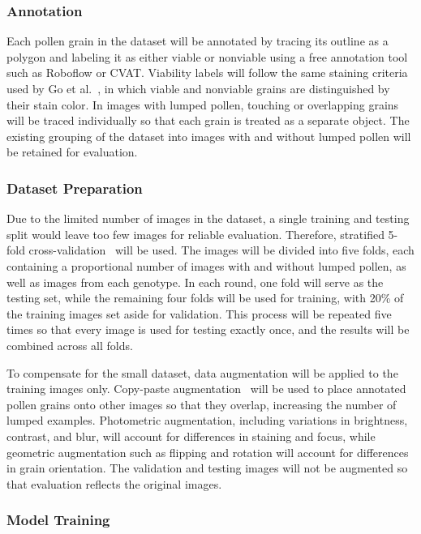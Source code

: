 \subsubsection{Annotation}
\label{sec:m-annotation}

Each pollen grain in the dataset will be annotated by tracing its outline as a polygon and labeling it as either viable or nonviable using a free annotation tool such as Roboflow or CVAT. Viability labels will follow the same staining criteria used by Go et al.~\cite{go2019}, in which viable and nonviable grains are distinguished by their stain color. In images with lumped pollen, touching or overlapping grains will be traced individually so that each grain is treated as a separate object. The existing grouping of the dataset into images with and without lumped pollen will be retained for evaluation.

\subsubsection{Dataset Preparation}
\label{sec:m-dataset-preparation}

Due to the limited number of images in the dataset, a single training and testing split would leave too few images for reliable evaluation. Therefore, stratified 5-fold cross-validation~\cite{kohavi1995} will be used. The images will be divided into five folds, each containing a proportional number of images with and without lumped pollen, as well as images from each genotype. In each round, one fold will serve as the testing set, while the remaining four folds will be used for training, with 20\% of the training images set aside for validation. This process will be repeated five times so that every image is used for testing exactly once, and the results will be combined across all folds.

To compensate for the small dataset, data augmentation will be applied to the training images only. Copy-paste augmentation~\cite{ghiasi2021} will be used to place annotated pollen grains onto other images so that they overlap, increasing the number of lumped examples. Photometric augmentation, including variations in brightness, contrast, and blur, will account for differences in staining and focus, while geometric augmentation such as flipping and rotation will account for differences in grain orientation. The validation and testing images will not be augmented so that evaluation reflects the original images.

\subsubsection{Model Training}
\label{sec:m-model-training}

